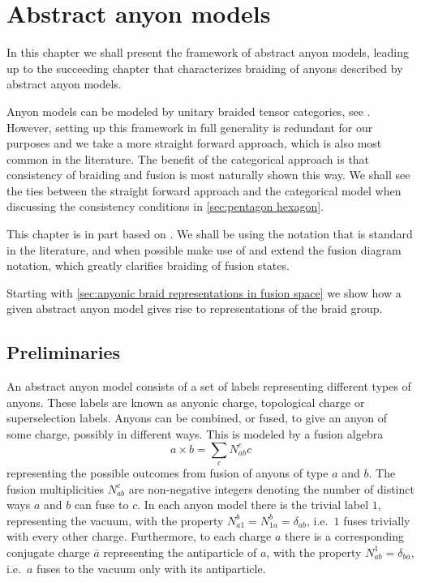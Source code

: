
\chapter{Abstract anyon models}\label{anyon models}

In this chapter we shall present the framework of abstract anyon models, leading up to the succeeding chapter that characterizes braiding of anyons described by abstract anyon models.

Anyon models can be modeled by unitary braided tensor categories, see \cite{kitaev,naaijkens,prakash,tensor categories,tuba}. However, setting up this framework in full generality is redundant for our purposes and we take a more straight forward approach, which is also most common in the literature. The benefit of the categorical approach is that consistency of braiding and fusion is most naturally shown this way. We shall see the ties between the straight forward approach and the categorical model when discussing the consistency conditions in \cref{sec:pentagon hexagon}.

This chapter is in part based on \cite{preskill,kitaev,bonderson}. We shall be using the notation that is standard in the literature, and when possible make use of and extend the fusion diagram notation, which greatly clarifies braiding of fusion states.

Starting with \cref{sec:anyonic braid representations in fusion space} we show how a given abstract anyon model gives rise to representations of the braid group.

\section{Preliminaries}

An abstract anyon model consists of a set of labels representing different types of anyons. These labels are known as anyonic charge, topological charge or superselection labels. Anyons can be combined, or fused, to give an anyon of some charge, possibly in different ways. This is modeled by a fusion algebra
\begin{equation}
  a \times b = \sum_c N_{ab}^c c
\end{equation}
representing the possible outcomes from fusion of anyons of type $a$ and $b$. The fusion multiplicities $N_{ab}^c$ are non-negative integers denoting the number of distinct ways $a$ and $b$ can fuse to $c$. In each anyon model there is the trivial label $1$, representing the vacuum, with the property $N_{a1}^b = N_{1a}^b = \delta_{ab}$, i.e.\ $1$ fuses trivially with every other charge. Furthermore, to each charge $a$ there is a corresponding conjugate charge $\bar{a}$ representing the antiparticle of $a$, with the property $N_{ab}^1 = \delta_{b\bar{a}}$, i.e.\ $a$ fuses to the vacuum only with its antiparticle.

